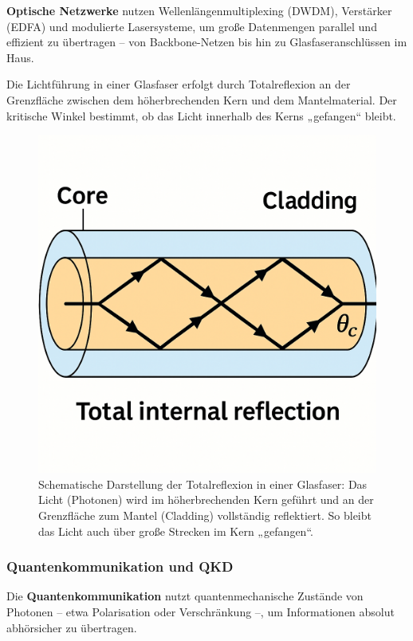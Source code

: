 \textbf{Optische Netzwerke} nutzen Wellenlängenmultiplexing (DWDM), Verstärker (EDFA) und modulierte Lasersysteme, um große Datenmengen parallel und effizient zu übertragen – von Backbone-Netzen bis hin zu Glasfaseranschlüssen im Haus.
\medskip
\begin{tcolorbox}[physikbox, title=Totalreflexion in Glasfasern]
	\label{box:glasfaser}
	\small
	Die Lichtführung in einer Glasfaser erfolgt durch Totalreflexion an der Grenzfläche zwischen dem höherbrechenden Kern und dem Mantelmaterial. Der kritische Winkel bestimmt, ob das Licht innerhalb des Kerns „gefangen“ bleibt.
\end{tcolorbox}
\begin{figure}[H]
	\centering
	\includegraphics[width=0.8\linewidth]{bilder/glasfaser.png}
	\caption{Schematische Darstellung der Totalreflexion in einer Glasfaser: Das Licht (Photonen) wird im höherbrechenden Kern geführt und an der Grenzfläche zum Mantel (Cladding) vollständig reflektiert. So bleibt das Licht auch über große Strecken im Kern „gefangen“.}
	\label{fig:totalreflexion}
\end{figure}

\subsubsection{Quantenkommunikation und QKD}

Die \textbf{Quantenkommunikation} nutzt quantenmechanische Zustände von Photonen – etwa Polarisation oder Verschränkung –, um Informationen absolut abhörsicher zu übertragen.

